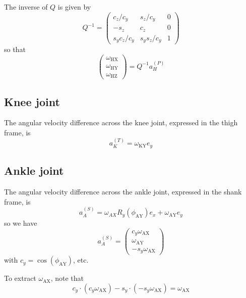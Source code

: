 \documentclass[a4paper]{article}
\begin{document}
The inverse of $Q$ is given by
\begin{equation}
Q^{-1} = \left(\begin{array}{ccc}
c_z/c_y & s_z/c_y & 0\\
-s_z & c_z & 0\\
s_y c_z / c_y & s_y s_z / c_y & 1
\end{array}\right)
\end{equation}
so that
\begin{equation}
\left(\begin{array}{c}
\omega_\mathrm{HX} \\ \omega_\mathrm{HY} \\ \omega_\mathrm{HZ}
\end{array}\right)
= Q^{-1} a_H^{(P)}
\end{equation}

\subsection{Knee joint}
The angular velocity difference across the knee joint, expressed in the thigh frame, is
\begin{equation}
a_K^{(T)} = \omega_\mathrm{KY} e_y
\end{equation}

\subsection{Ankle joint}
The angular velocity difference across the ankle joint, expressed in the shank frame, is
\begin{equation}
a_A^{(S)} = \omega_{AX} R_y(\phi_\mathrm{AY}) e_x + \omega_\mathrm{AY} e_y
\end{equation}
so we have
\begin{equation}
a_A^{(S)} = \left( \begin{array}{c}
c_y \omega_\mathrm{AX}\\ \omega_\mathrm{AY}\\ -s_y \omega_\mathrm{AX}
\end{array}\right)
\end{equation}
with $c_y = \cos(\phi_\mathrm{AY})$, etc.

To extract $\omega_\mathrm{AX}$, note that
\begin{equation}
c_y \cdot (c_y \omega_\mathrm{AX}) - s_y \cdot(-s_y \omega_\mathrm{AX}) = \omega_\mathrm{AX}
\end{equation}
\end{document}
